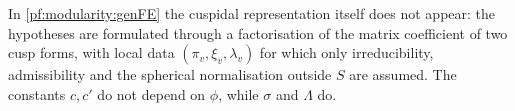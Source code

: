 \begin{remark}\label{pf:modularity:rem-GJ}
In \cref{pf:modularity:genFE} the cuspidal representation itself does not appear: the hypotheses are formulated
through a factorisation of the matrix coefficient of two cusp forms, with local data $(\pi_v,\xi_v,\lambda_v)$ for which
only irreducibility, admissibility and the spherical normalisation outside $S$ are assumed. The constants $c,c'$ do not
depend on $\phi$, while $\sigma$ and $\Lambda$ do.
\end{remark}

